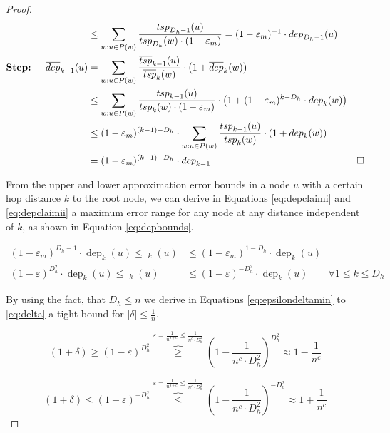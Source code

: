 \documentclass[11pt]{article}
\newcommand*\eps{\varepsilon}
\newcommand{\todoI}[1]{}\newcommand{\blueI}[1]{}
\newcommand{\tsp}{\mathop{tsp}}
\newcommand{\tspapp}{\mathop{\overline{tsp}}}
\newcommand{\dep}{\mathop{dep}}
\newcommand{\depapp}{\mathop{\overline{dep}}}
\renewcommand{\epsilon}{\varepsilon}
\begin{document}
\begin{proof}
\begin{align}
&& &\leq\sum_{w:u\in P(w)}\frac{\tsp\nolimits_{D_h-1}(u)}{\tsp\nolimits_{D_h}(w)\cdot(1-\varepsilon_m)}=(1-\varepsilon_m)^{-1}\cdot\dep\nolimits_{D_h-1}(u)\label{eq:depbaseii}  \allowdisplaybreaks[4]\\
\textbf{Step: }&&
\depapp\nolimits_{k-1}(u)&=\sum_{w:u\in P(w)}\frac{\tspapp\nolimits_{k-1}(u)}{\tspapp\nolimits_{k}(w)}\cdot\left(1+\depapp\nolimits_{k}(w)\right)\nonumber\\
&& &\leq\sum_{w:u\in P(w)}\frac{\tsp\nolimits_{k-1}(u)}{\tsp\nolimits_{k}(w)\cdot(1-\epsilon_m)}\cdot\left(1+(1-\epsilon_m)^{k-D_h}\cdot\dep\nolimits_k(w)\right)\nonumber\\
&& &\leq(1-\epsilon_m)^{(k-1)-D_h}\cdot\sum_{w:u\in P(w)}\frac{\tsp\nolimits_{k-1}(u)}{\tsp\nolimits_{k}(w)}\cdot\left(1+\dep\nolimits_k(w)\right)\nonumber\\
&& &=(1-\epsilon_m)^{(k-1)-D_h}\cdot\dep\nolimits_{k-1} & \square
\label{eq:depstepii}
\end{align}

From the upper and lower approximation error bounds in a node $u$ with a certain hop distance $k$ to the root node, we can derive in Equations \eqref{eq:depclaimi} and \eqref{eq:depclaimii} a maximum error range for any node at any distance independent of $k$, as shown in Equation \eqref{eq:depbounds}.
\todoI{$\eps$ is later $n^{-c-3}$}
\begin{align}
(1-\epsilon_m)^{D_h-1}\cdot\dep\nolimits_k(u)\leq\depapp\nolimits_k(u) &\leq (1-\epsilon_m)^{1-D_h}\cdot\dep\nolimits_k(u) \nonumber\\ 
(1-\epsilon)^{D_h^2}\cdot\dep\nolimits_k(u)\leq\depapp\nolimits_k(u) &\leq(1-\epsilon)^{-D_h^2}\cdot\dep\nolimits_k(u)\qquad\forall 1\leq k\leq D_h
\label{eq:depbounds}
\end{align}

By using the fact, that $D_h\leq n$ we derive in Equations \eqref{eq:epsilondeltamin} to \eqref{eq:delta} a tight bound for $|\delta|\leq\frac{1}{n}$.

\begin{equation}
(1+\delta)\geq(1-\epsilon)^{D_h^2}\overbrace{\geq}^{\epsilon=\frac{1}{n^{3+c}}\leq\frac{1}{n^c\cdot D_h^2}}\left(1-\frac{1}{n^c\cdot D_h^2}\right)^{D_h^2}\approx 1-\frac{1}{n^c}
\label{eq:epsilondeltamin}
\end{equation}

\begin{equation}
(1+\delta)\leq(1-\epsilon)^{-D_h^2}\overbrace{\leq}^{\epsilon=\frac{1}{n^{3+c}}\leq\frac{1}{n^c\cdot D_h^2}}\left(1-\frac{1}{n^c\cdot D_h^2}\right)^{-D_h^2}\approx 1+\frac{1}{n^c}
\label{eq:epsilondeltamax}
\end{equation}


\end{proof}
\end{document}
